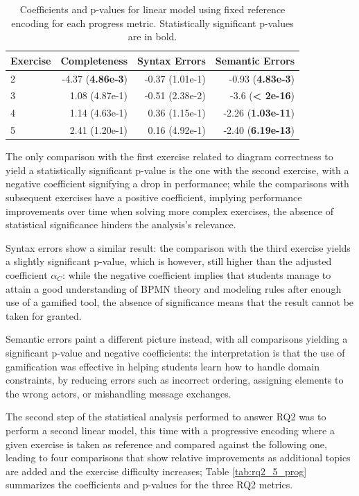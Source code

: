 \begin{table}[ht]
    \footnotesize
    \centering
    \caption{Coefficients and p-values for linear model using fixed reference encoding for each progress metric. Statistically significant p-values are in bold.}
    \begin{tabular}{lrrr}
    \toprule
    Exercise & Completeness & Syntax Errors & Semantic Errors  \\
    \midrule
    2 & -4.37 (\textbf{4.86e-3}) & -0.37 (1.01e-1) & -0.93 (\textbf{4.83e-3}) \\
    3 & 1.08 (4.87e-1) & -0.51 (2.38e-2) & -3.6 (\textbf{\textless{} 2e-16}) \\
    4 & 1.14 (4.63e-1) & 0.36 (1.15e-1) & -2.26 (\textbf{1.03e-11}) \\
    5 & 2.41 (1.20e-1) & 0.16 (4.92e-1) & -2.40 (\textbf{6.19e-13}) \\
    \bottomrule
    \end{tabular}
    \label{tab:rq2_5_start}
\end{table}

The only comparison with the first exercise related to diagram correctness to yield a statistically significant p-value is the one with the second exercise, with a negative coefficient signifying a drop in performance; while the comparisons with subsequent exercises have a positive coefficient, implying performance improvements over time when solving more complex exercises, the absence of statistical significance hinders the analysis's relevance.

Syntax errors show a similar result: the comparison with the third exercise yields a slightly significant p-value, which is however, still higher than the adjusted coefficient  $\alpha_C$: while the negative coefficient implies that students manage to attain a good understanding of BPMN theory and modeling rules after enough use of a gamified tool, the absence of significance means that the result cannot be taken for granted.

Semantic errors paint a different picture instead, with all comparisons yielding a significant p-value and negative coefficients: the interpretation is that the use of gamification was effective in helping students learn how to handle domain constraints, by reducing errors such as incorrect ordering, assigning elements to the wrong actors, or mishandling message exchanges.

The second step of the statistical analysis performed to answer RQ2 was to perform a second linear model, this time with a progressive encoding where a given exercise is taken as reference and compared against the following one, leading to four comparisons that show relative improvements as additional topics are added and the exercise difficulty increases; Table \ref{tab:rq2_5_prog} summarizes the coefficients and p-values for the three RQ2 metrics.

